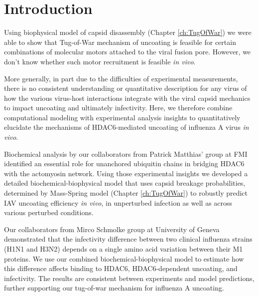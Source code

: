 \section{Introduction}

Using biophysical model of capsid disassembly (Chapter \ref{ch:TugOfWar}) we were able to show that Tug-of-War mechanism of uncoating is feasible for certain combinations of molecular motors attached to the viral fusion pore. However, we don't know whether such motor recruitment is feasible \textit{in vivo}.

More generally, in part due to the difficulties of experimental measurements, there is no consistent understanding or quantitative description for any virus of how the various virus-host interactions integrate with the viral capsid mechanics to impact uncoating and ultimately infectivity. Here, we therefore combine computational modeling with experimental analysis insights to quantitatively elucidate the mechanisms of HDAC6-mediated uncoating of influenza A virus \textit{in vivo}. 

Biochemical analysis by our collaborators from Patrick Matthias' group at FMI identified an essential role for unanchored ubiquitin chains in bridging HDAC6 with the actomyosin network. Using those experimental insights we developed a detailed biochemical-biophysical model that uses capsid breakage probabilities, determined by Mass-Spring model (Chapter \ref{ch:TugOfWar}) to robustly predict IAV uncoating efficiency \textit{in vivo}, in unperturbed infection as well as across various perturbed conditions.

Our collaborators from Mirco Schmolke group at University of Geneva demonstrated that the infectivity difference between two clinical influenza strains (H1N1 and H3N2) depends on a single amino acid variation between their M1 proteins. We use our combined biochemical-biophysical model to estimate how this difference affects binding to HDAC6, HDAC6-dependent uncoating, and infectivity. The results are consistent between experiments and model predictions, further supporting our tug-of-war mechanism for influenza A uncoating.